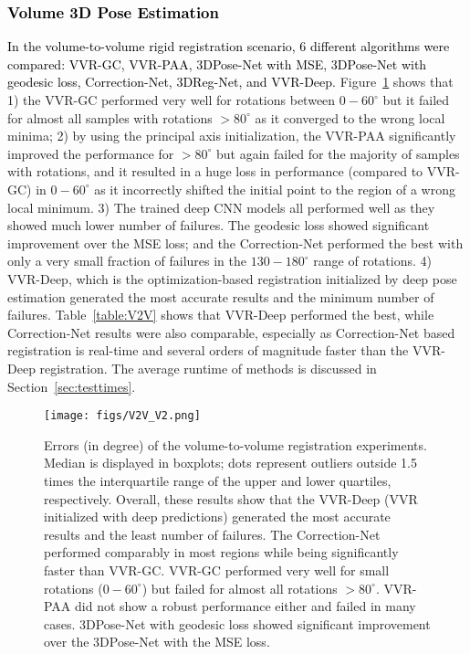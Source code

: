 \documentclass[journal,transmag]{IEEEtran}
\begin{document}
\subsubsection{\textcolor{black}{Volume 3D Pose Estimation}}
\textcolor{black}{In the volume-to-volume rigid registration scenario, 6 different algorithms were compared: VVR-GC, VVR-PAA, 3DPose-Net with MSE, 3DPose-Net with geodesic loss, Correction-Net, 3DReg-Net, and VVR-Deep.} Figure~\ref{fig:V2V} shows that 1) the VVR-GC performed very well for rotations between $0-60^\circ$ but it failed for almost all samples with rotations $>80^\circ$ as it converged to the wrong local minima; 2) by using the principal axis initialization, the VVR-PAA significantly improved the performance for $>80^\circ$ but again failed for the majority of samples with rotations, and it resulted in a huge loss in performance (compared to VVR-GC) in $0-60^\circ$ as it incorrectly shifted the initial point to the region of a wrong local minimum. 3) The trained deep CNN models all performed well as they showed much lower number of failures. The geodesic loss showed significant improvement over the MSE loss; and the Correction-Net performed the best with only a very small fraction of failures in the $130-180^\circ$ range of rotations. 4) VVR-Deep, which is the optimization-based registration initialized by deep pose estimation generated the most accurate results and the minimum number of failures. Table~\ref{table:V2V} shows that VVR-Deep performed the best, while Correction-Net results were also comparable, especially as Correction-Net based registration is real-time and several orders of magnitude faster than the VVR-Deep registration. The average runtime of methods is discussed in Section~\ref{sec:testtimes}. %




\begin{figure}
    \centering
    \texttt{[image: figs/V2V\_V2.png]}
    \caption{Errors (in degree) of the volume-to-volume registration experiments. Median is displayed in boxplots; dots represent outliers outside 1.5 times the interquartile range of the upper and lower quartiles, respectively. Overall, these results show that the VVR-Deep (VVR initialized with deep predictions) generated the most accurate results and the least number of failures. The Correction-Net performed comparably in most regions while being significantly faster than VVR-GC. VVR-GC performed very well for small rotations ($0-60^\circ$) but failed for almost all rotations $>80^\circ$. VVR-PAA did not show a robust performance either and failed in many cases. 3DPose-Net with geodesic loss showed significant improvement over the 3DPose-Net with the MSE loss.}
    \label{fig:V2V}
\end{figure}
\end{document}

